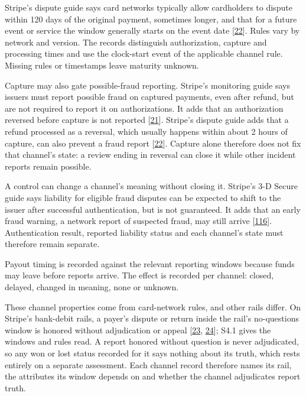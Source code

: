 \documentclass[
  11pt,
]{article}
\begin{document}
Stripe's dispute guide says card networks typically allow cardholders to
dispute within 120 days of the original payment, sometimes longer, and
that for a future event or service the window generally starts on the
event date {[}\protect\hyperlink{ref-Stripe2026Disputes}{22}{]}. Rules
vary by network and version. The records distinguish authorization,
capture and processing times and use the clock-start event of the
applicable channel rule. Missing rules or timestamps leave maturity
unknown.

Capture may also gate possible-fraud reporting. Stripe's monitoring
guide says issuers must report possible fraud on captured payments, even
after refund, but are not required to report it on authorizations. It
adds that an authorization reversed before capture is not reported
{[}\protect\hyperlink{ref-Stripe2026MonitoringPrograms}{21}{]}. Stripe's
dispute guide adds that a refund processed as a reversal, which usually
happens within about 2 hours of capture, can also prevent a fraud report
{[}\protect\hyperlink{ref-Stripe2026Disputes}{22}{]}. Capture alone
therefore does not fix that channel's state: a review ending in reversal
can close it while other incident reports remain possible.

A control can change a channel's meaning without closing it. Stripe's
3-D Secure guide says liability for eligible fraud disputes can be
expected to shift to the issuer after successful authentication, but is
not guaranteed. It adds that an early fraud warning, a network report of
suspected fraud, may still arrive
{[}\protect\hyperlink{ref-Stripe2026ThreeDS}{116}{]}. Authentication
result, reported liability status and each channel's state must
therefore remain separate.

Payout timing is recorded against the relevant reporting windows because
funds may leave before reports arrive. The effect is recorded per
channel: closed, delayed, changed in meaning, none or unknown.

These channel properties come from card-network rules, and other rails
differ. On Stripe's bank-debit rails, a payer's dispute or return inside
the rail's no-questions window is honored without adjudication or appeal
{[}\protect\hyperlink{ref-Stripe2026SEPADebit}{23},
\protect\hyperlink{ref-Stripe2026ACHTerms}{24}{]}; S4.1 gives the
windows and rules read. A report honored without question is never
adjudicated, so any won or lost status recorded for it says nothing
about its truth, which rests entirely on a separate assessment. Each
channel record therefore names its rail, the attributes its window
depends on and whether the channel adjudicates report truth.
\end{document}
